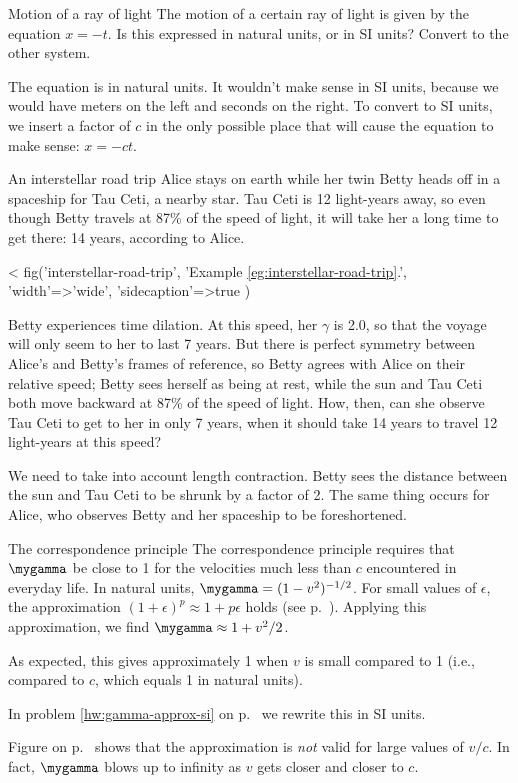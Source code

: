 \begin{eg}{Motion of a ray of light}\label{eg:natural-to-si-2}
\egquestion The motion of a certain ray of light is given by the equation $x=-t$. Is this expressed in
natural units, or in SI units? Convert to the other system.

\eganswer The equation is in natural units. It wouldn't make sense in SI units, because we would have
meters on the left and seconds on the right. To convert to SI units, we insert a factor of $c$ in the only
possible place that will cause the equation to make sense: $x=-ct$.
\end{eg}


\begin{eg}{An interstellar road trip}\label{eg:interstellar-road-trip}
Alice stays on earth while her twin Betty
heads off in a spaceship for Tau Ceti, a nearby star. Tau Ceti is 12 light-years
away, so even though Betty travels at 87\% of the speed of light, it will take
her a long time to get there: 14 years, according to Alice.

<%
  fig('interstellar-road-trip',
    'Example \ref{eg:interstellar-road-trip}.',
    {
      'width'=>'wide',
      'sidecaption'=>true
    }
  )

Betty
experiences time dilation. At this speed, her $\gamma$ is 2.0, so that the voyage will
only seem to her to last 7 years. But there is perfect symmetry between Alice's
and Betty's frames of reference, so Betty agrees with Alice on their relative speed;
Betty sees herself as being at rest, while the sun and Tau Ceti both move backward
at 87\% of the speed of light. How, then, can she observe Tau Ceti to get to her
in only 7 years, when it should take 14 years to travel 12 light-years at this speed?

We need to take into account length contraction.
Betty sees the distance between the sun and Tau Ceti
to be shrunk by a factor of 2. The same thing occurs for Alice, who observes
Betty and her spaceship to be foreshortened.
\end{eg}

\begin{eg}{The correspondence principle}\label{eg:gamma-for-low-v}
The correspondence principle requires that $\mygamma$ be close to 1
for the velocities much less than $c$ encountered in everyday life.
In natural units, $\mygamma=(1-v^2)^{-1/2}$.
For small values of $\epsilon$, the approximation 
$(1+\epsilon)^p\approx 1+p\epsilon$ holds (see p.~\pageref{math-approx-exp-and-log}).
Applying this approximation, we find $\mygamma\approx1+v^2/2$.

As expected, this gives approximately 1 when $v$ is small compared to 1 (i.e., compared to $c$, which equals 1
in natural units).

In problem \ref{hw:gamma-approx-si} on p.~\pageref{hw:gamma-approx-si} we rewrite
this in SI units.

Figure  on p.~\pageref{fig:gamma-graph-small} shows that the approximation
is \emph{not} valid for large values of $v/c$. In fact, $\mygamma$
blows up to infinity as $v$ gets closer and closer to $c$.
\end{eg}

